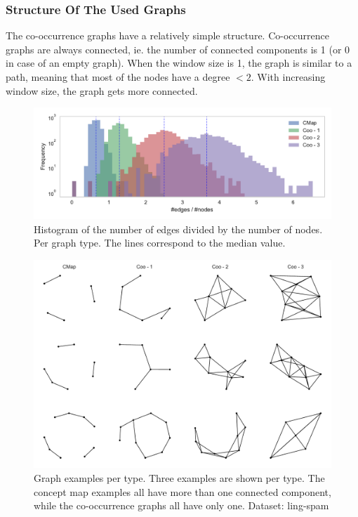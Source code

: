 
\subsubsection{Structure Of The Used Graphs}
The co-occurrence graphs have a relatively simple structure.
Co-occurrence graphs are always connected, ie. the number of connected components is 1 (or 0 in case of an empty graph).
When the window size is 1, the graph is similar to a path, meaning that most of the nodes have a degree $< 2$. With increasing window size, the graph gets more connected.

\begin{figure}[h]
\centering
\includegraphics[width=0.7\linewidth]{assets/figures/hist-edgesnodes.pdf}
\caption{Histogram of the number of edges divided by the number of nodes. Per graph type. The lines correspond to the median value.}
\label{fig:histogram-edges-div-nodes-per-type}
\end{figure}

\begin{figure}[h]
\centering
\includegraphics[width=0.6\linewidth]{assets/figures/graph-examples.pdf}
\caption{Graph examples per type. Three examples are shown per type. The concept map examples all have more than one connected component, while the co-occurrence graphs all have only one. Dataset: ling-spam}
\end{figure}

